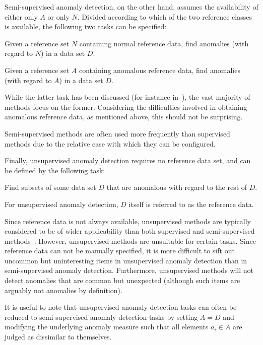 Semi-supervised anomaly detection, on the other hand, assumes the availability of either only $A$ or only $N$. Divided according to which of the two reference classes is available, the following two tasks can be specified:
\begin{task}
  Given a reference set $N$ containing normal reference data, find anomalies (with regard to $N$) in a data set $D$.
\end{task}
\begin{task}
\label{task:semisupervised_anomaly_detection}
  Given a reference set $A$ containing anomalous reference data, find anomalies (with regard to $A$) in a data set $D$.
\end{task}

While the latter task has been discussed (for instance in~\cite{dasgupta}), the vast majority of methods focus on the former. Considering the difficulties involved in obtaining anomalous reference data, as mentioned above, this should not be surprising.

Semi-supervised methods are often used more frequently than supervised methods due to the relative ease with which they can be configured.

Finally, unsupervised anomaly detection requires no reference data set, and can be defined by the following task:
\begin{task}
\label{task:unsupervised_anomaly_detection}
  Find subsets of some data set $D$ that are anomalous with regard to the rest of $D$.
\end{task}

For unsupervised anomaly detection, $D$ itself is referred to as the reference data.

Since reference data is not always available, unsupervised methods are typically considered to be of wider applicability than both supervised and semi-supervised methods~\cite{chandola}. However, unsupervised methods are unsuitable for certain tasks. Since reference data can not be manually specified, it is more difficult to sift out uncommon but uninteresting items in unsupervised anomaly detection than in semi-supervised anomaly detection. Furthermore, unsupervised methods will not detect anomalies that are common but unexpected (although such items are arguably not anomalies by definition).

It is useful to note that unsupervised anomaly detection tasks can often be reduced to semi-supervised anomaly detection tasks by setting $A = D$ and modifying the underlying anomaly measure such that all elements $a_i \in A$ are judged as dissimilar to themselves.

